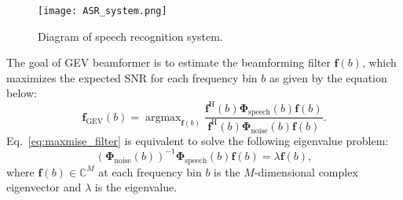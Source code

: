 \documentclass[a4paper]{article}
\DeclareMathOperator*{\argmax}{argmax}
\begin{document}
\begin{figure}[t]
  \centering
  \texttt{[image: ASR\_system.png]}
  \caption{Diagram of speech recognition system.}
  \label{fig:speech_sys}
\end{figure}

The goal of GEV beamformer \cite{warsitz2007blind} is to estimate the beamforming filter $\mathbf{f} (b)$, which maximizes the expected SNR for each frequency bin $b$ as given by the equation below:
\begin{equation}
\mathbf{f}_{\textrm{GEV}} (b) = \argmax_{\mathbf{f}  (b)} \frac{\mathbf{f}^\textrm{H} (b)\mathbf{\Phi}_{\text{speech}} (b) \mathbf{f} (b)}{\mathbf{f}^\textrm{H}  (b) \mathbf{\Phi}_{\text{noise}} (b) \mathbf{f} (b)}.
\label{eq:maxmise_filter}
\end{equation}
Eq.~\eqref{eq:maxmise_filter} is equivalent to solve the following eigenvalue problem:
\begin{equation}
(\mathbf{\Phi}_{\text{noise}} (b) ) ^{-1} \mathbf{\Phi}_{\text{speech}} (b) \mathbf{f}  (b) = \lambda \mathbf{f}  (b),
\end{equation}
where $\mathbf{f}  (b) \in \mathbb{C} ^{M} $ at each frequency bin $b$ is the $M$-dimensional complex eigenvector and $\lambda$ is the eigenvalue. 


\begin{table*}[tbh]
  \caption{Speech Enhancement Scores}
  \label{tab:se_scores}
  \centering
\end{table*}
\end{document}
